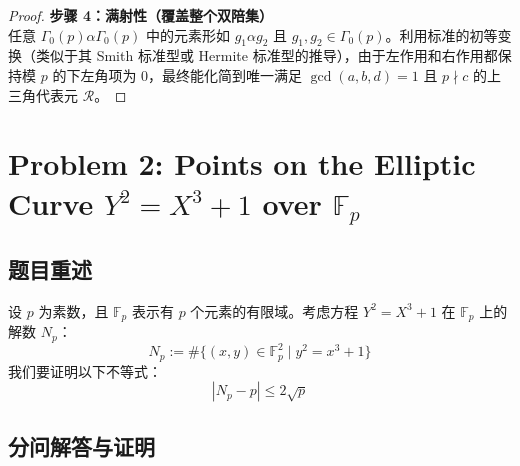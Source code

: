 \documentclass[]{article}
\begin{document}
\begin{proof}
		\textbf{步骤 4：满射性（覆盖整个双陪集）} \\
		任意 $\Gamma_0(p)\alpha\Gamma_0(p)$ 中的元素形如 $g_1 \alpha g_2$ 且 $g_1, g_2 \in \Gamma_0(p)$。利用标准的初等变换（类似于其 Smith 标准型或 Hermite 标准型的推导），由于左作用和右作用都保持模 $p$ 的下左角项为 $0$，最终能化简到唯一满足 $\gcd(a,b,d)=1$ 且 $p \nmid c$ 的上三角代表元 $\mathcal{R}$。
	\end{proof}
	
	\pagebreak
	
	\section*{Problem 2: Points on the Elliptic Curve $Y^2 = X^3 + 1$ over $\mathbb{F}_p$}
	
	\subsection*{题目重述}
	设 $p$ 为素数，且 $\mathbb{F}_p$ 表示有 $p$ 个元素的有限域。考虑方程 $Y^2 = X^3 + 1$ 在 $\mathbb{F}_p$ 上的解数 $N_p$：
	\[ N_p := \#\{ (x,y) \in \mathbb{F}_p^2 \;|\; y^2 = x^3 + 1 \} \]
	我们要证明以下不等式：
	\[ |N_p - p| \le 2\sqrt{p} \]
	
	\subsection*{分问解答与证明}
	
\end{document}
